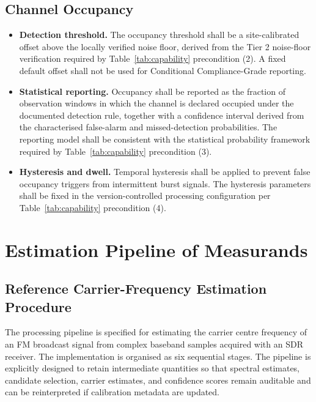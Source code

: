 \documentclass[11pt]{article}
\begin{document}
\subsection*{Channel Occupancy}

\begin{itemize}
    \item \textbf{Detection threshold.} The occupancy threshold shall be a site-calibrated offset above the locally verified noise floor, derived from the Tier 2 noise-floor verification required by Table~\ref{tab:capability} precondition (2). A fixed default offset shall not be used for Conditional Compliance-Grade reporting.
    \item \textbf{Statistical reporting.} Occupancy shall be reported as the fraction of observation windows in which the channel is declared occupied under the documented detection rule, together with a confidence interval derived from the characterised false-alarm and missed-detection probabilities. The reporting model shall be consistent with the statistical probability framework required by Table~\ref{tab:capability} precondition (3).
    \item \textbf{Hysteresis and dwell.} Temporal hysteresis shall be applied to prevent false occupancy triggers from intermittent burst signals. The hysteresis parameters shall be fixed in the version-controlled processing configuration per Table~\ref{tab:capability} precondition (4).
\end{itemize}

\section{Estimation Pipeline of Measurands}
\label{sec:estimation}

\subsection*{Reference Carrier-Frequency Estimation Procedure}

The processing pipeline is specified for estimating the carrier centre frequency of an FM broadcast signal from complex baseband samples acquired with an SDR receiver. The implementation is organised as six sequential stages. The pipeline is explicitly designed to retain intermediate quantities so that spectral estimates, candidate selection, carrier estimates, and confidence scores remain auditable and can be reinterpreted if calibration metadata are updated.
\end{document}
